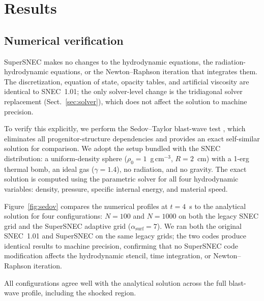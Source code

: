 \documentclass[twocolumn,linenumbers]{aastex701}
\begin{document}
\section{Results}
\label{sec:validation}
\subsection{Numerical verification}
\label{sec:verification}

SuperSNEC makes no changes to the hydrodynamic equations, the radiation-hydrodynamic equations, or the Newton--Raphson iteration that integrates them.  The discretization, equation of state, opacity tables, and artificial viscosity are identical to SNEC~1.01; the only solver-level change is the tridiagonal solver replacement (Sect.~\ref{sec:solver}), which does not affect the solution to machine precision.  

To verify this explicitly, we perform the Sedov--Taylor blast-wave test \citep{Sedov1959}, which eliminates all progenitor-structure dependencies and provides an exact self-similar solution for comparison.  We adopt the setup bundled with the SNEC distribution: a uniform-density sphere ($\rho_0 = 1$~g\,cm$^{-3}$, $R = 2$~cm) with a 1-erg thermal bomb, an ideal gas ($\gamma = 1.4$), no radiation, and no gravity.  The exact solution is computed using the \citet{KammTimmes2007} parametric solver for all four hydrodynamic variables: density, pressure, specific internal energy, and material speed.


Figure~\ref{fig:sedov} compares the numerical profiles at $t = 4$~s to the analytical solution for four configurations: $N = 100$ and $N = 1000$ on both the legacy SNEC grid and the SuperSNEC adaptive grid ($\alpha_\mathrm{surf} = 7$).  We ran both the original SNEC~1.01 and SuperSNEC on the same legacy grids; the two codes produce identical results to machine precision, confirming that no SuperSNEC code modification affects the hydrodynamic stencil, time integration, or Newton--Raphson iteration.

All configurations agree well with the analytical solution across the full blast-wave profile, including the shocked region.  
\end{document}
